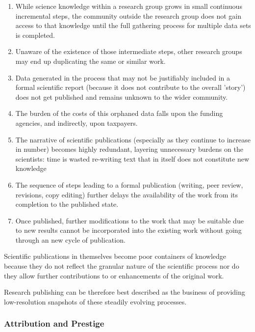 \documentclass[final,authoryear,3p]{elsarticle-open-drafting}
\begin{document}
\begin{enumerate}
\item While science knowledge within a research group grows in small continuous incremental steps, the community outside the research group does not gain access to that knowledge until the full gathering process for multiple data sets is completed. 
\item Unaware of the existence of those intermediate steps, other research groups may end up duplicating the same or similar work. 
\item Data generated in the process that may not be justifiably included in a formal scientific report (because it does not 
contribute to the overall 'story') does not get published and remains unknown to the wider community. 
\item The burden of the costs of this orphaned data falls upon the funding agencies, and indirectly, upon taxpayers. 
\item The narrative of scientific publications (especially as they continue to increase in number) becomes highly redundant, 
layering unnecessary burdens on the scientists: time is wasted re-writing text that in itself does not constitute new knowledge
\item The sequence of steps leading to a formal publication (writing, peer review, revisions, copy editing) further delays the 
availability of the work from its completion to the published state. %
\item Once published, further modifications to the work that may be suitable due to new results cannot be incorporated into the existing work without going through an new cycle of publication. 
\end{enumerate}

Scientific publications in themselves become poor containers of knowledge because they do not reflect the granular nature of the scientific process nor do they allow further contributions to or enhancements of the original work. 

Research publishing can be therefore best described as the business of providing low-resolution snapshots of these steadily evolving processes. 

\subsubsection{Attribution and Prestige}
\end{document}
